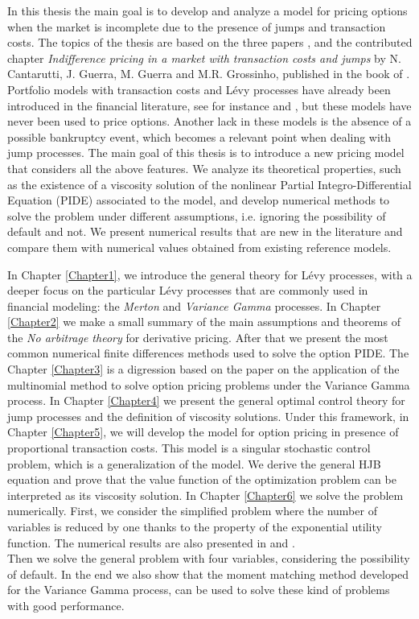 In this thesis the main goal is to develop and analyze a model for pricing options when the market is incomplete due to the presence of jumps and transaction costs. 
The topics of the thesis are based on the three papers 
\cite{Canta2}, \cite{Canta} and the contributed chapter \emph{Indifference pricing in a market with transaction costs and jumps} by N. Cantarutti, J. Guerra, M. Guerra and 
M.R. Grossinho, published in the book of \cite{Matthias}.\\
Portfolio models with transaction costs and Lévy processes have already been introduced in the financial literature, see for instance \cite{OkSu01} and \cite{BKR01}, 
but these models have never been used to price options. Another lack in these models is the absence of a possible bankruptcy event, which becomes a relevant point 
when dealing with jump processes.  
The main goal of this thesis is to introduce a new pricing model that considers all the above features. 
We analyze its theoretical properties, such as the existence of a viscosity solution of the nonlinear 
Partial Integro-Differential Equation (PIDE) associated to the model, and develop numerical methods to solve the problem under different assumptions, i.e. ignoring the 
possibility of default and not.
We present numerical results that are new in the literature and compare them with numerical values obtained from existing reference models. 



In Chapter \ref{Chapter1}, we introduce the general theory for Lévy processes, with a deeper focus on the particular Lévy processes that are commonly used in financial modeling:  
the \emph{Merton} and \emph{Variance Gamma} processes.   
In Chapter \ref{Chapter2} we make a small summary of the main assumptions and theorems of the \emph{No arbitrage theory} for derivative pricing. After that we present 
the most common numerical finite differences methods used to solve the option PIDE. 
The Chapter \ref{Chapter3} is a digression based on the paper \cite{Canta2} on the application of the multinomial method to solve option pricing problems under the Variance Gamma process. 
In Chapter \ref{Chapter4} we present the general optimal control theory for jump processes and the definition of viscosity solutions. 
Under this framework, in Chapter \ref{Chapter5}, we will develop the model for option pricing in presence of proportional transaction costs. This model is a singular stochastic
control problem, which is a generalization of the \cite{DaPaZa93} model. We derive the general HJB equation and prove that the value function of the optimization problem 
can be interpreted as its viscosity solution.  
In Chapter \ref{Chapter6} we solve the problem numerically. 
First, we consider the simplified problem where the number of variables is reduced by one thanks to the property of the exponential utility function. 
The numerical results are also presented in \cite{Canta} and \cite{Matthias}.\\
Then we solve the general problem with four variables, considering the possibility of default. In the end we also show that the moment matching method developed for 
the Variance Gamma process, can be used to solve these kind of problems with good performance. 


